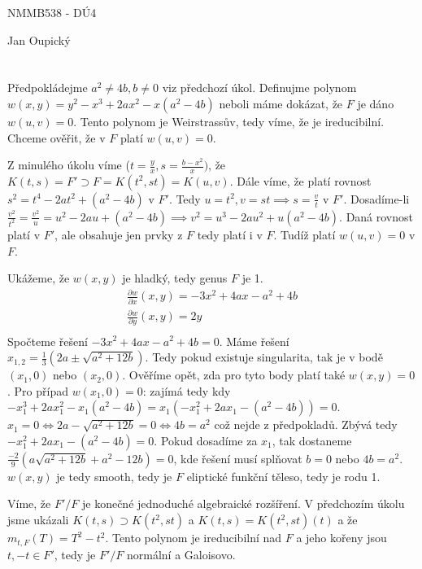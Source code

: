 \documentclass[12pt, a4paper]{article}
\begin{document}
\begin{center}
\large NMMB538 - DÚ4

\normalsize Jan Oupický
\end{center}
\vspace{1\baselineskip}

\section{}
Předpokládejme $a^2 \neq 4b, b \neq 0$ viz předchozí úkol. Definujme polynom $w(x,y) = y^2 - x^3 + 2ax^2 - x(a^2-4b)$ neboli máme dokázat, že $F$ je dáno $w(u,v)=0$. Tento polynom je Weirstrassův, tedy víme, že je ireducibilní. Chceme ověřit, že v $F$ platí $w(u,v)=0$.

Z minulého úkolu víme ($t=\frac{y}{x}, s=\frac{b-x^2}{x})$, že $K(t,s)=F' \supset F = K(t^2, st) = K(u,v)$. Dále víme, že platí rovnost $s^2 = t^4 - 2at^2 + (a^2-4b)$ v $F'$. Tedy $u = t^2, v = st \implies s = \frac{v}{t}$ v $F'$. Dosadíme-li $\frac{v^2}{t^2}=\frac{v^2}{u} = u^2-2au+(a^2-4b) \implies v^2 = u^3-2au^2+u(a^2-4b)$. Daná rovnost platí v $F'$, ale obsahuje jen prvky z $F$ tedy platí i v $F$. Tudíž platí $w(u,v)=0$ v $F$.

Ukážeme, že $w(x,y)$ je hladký, tedy genus $F$ je 1.
\begin{gather*}
\frac{\partial w}{\partial x} (x,y) = -3x^2 + 4ax - a^2 + 4b\\
\frac{\partial w}{\partial y} (x,y) = 2y\\
\end{gather*}
Spočteme řešení $-3x^2 + 4ax - a^2 + 4b = 0$. Máme řešení $x_{1,2} = \frac{1}{3}(2a\pm \sqrt{a^2+12b})$. Tedy pokud existuje singularita, tak je v bodě $(x_1, 0)$ nebo $(x_2, 0)$. Ověříme opět, zda pro tyto body platí také $w(x,y)=0$. Pro případ $w(x_1,0) = 0$: zajímá tedy kdy $- x_1^3 + 2ax_1^2 - x_1(a^2-4b) = x_1(- x_1^2 + 2ax_1 -(a^2-4b)) = 0$. $x_1 = 0 \iff 2a - \sqrt{a^2+12b} = 0 \iff 4b = a^2$ což nejde z předpokladů. Zbývá tedy $- x_1^2 + 2ax_1 -(a^2-4b) = 0$. Pokud dosadíme za $x_1$, tak dostaneme $\frac{-2}{9}\left(a \sqrt{a^2+12 b}+a^2-12 b\right) = 0$, kde řešení musí splňovat $b=0$ nebo $4b = a^2$.
$w(x,y)$ je tedy smooth, tedy je $F$ eliptické funkční těleso, tedy je rodu 1.

Víme, že $F'/F$ je konečné jednoduché algebraické rozšíření. V předchozím úkolu jsme ukázali $K(t,s)\supset K(t^2,st)$ a $K(t,s)=K(t^2,st)(t)$ a že $m_{t,F}(T)=T^2-t^2$. Tento polynom je ireducibilní nad $F$ a jeho kořeny jsou $t,-t \in F'$, tedy je $F'/F$ normální a Galoisovo.
\end{document}
